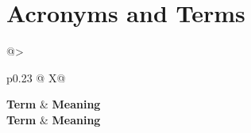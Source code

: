 \chapter*{Acronyms and Terms}
\begin{xltabular}{\textwidth}{@{}>{\raggedright\arraybackslash}p{0.23\textwidth} @{\hspace{1.5em}} X@{}}
\toprule
\textbf{Term} & \textbf{Meaning}\\
\midrule
\endfirsthead
\toprule
\textbf{Term} & \textbf{Meaning}\\
\midrule
\endhead
\bottomrule
\endlastfoot
\printacronyms\\
\end{xltabular}
